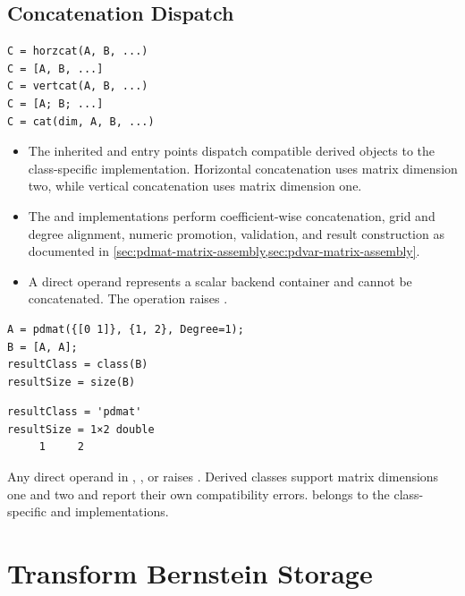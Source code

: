 \subsection{Concatenation Dispatch}
\label{sec:pdbase-concatenation-dispatch}

\syntaxhead
\begin{lstlisting}[style=dpsyntax]
C = horzcat(A, B, ...)
C = [A, B, ...]
C = vertcat(A, B, ...)
C = [A; B; ...]
C = cat(dim, A, B, ...)
\end{lstlisting}

\descriptionhead
\begin{itemize}[leftmargin=*]
    \item The inherited  and  entry points dispatch compatible derived objects to the class-specific  implementation. Horizontal concatenation uses matrix dimension two, while vertical concatenation uses matrix dimension one.
    \item The  and  implementations perform coefficient-wise concatenation, grid and degree alignment, numeric promotion, validation, and result construction as documented in \cref{sec:pdmat-matrix-assembly,sec:pdvar-matrix-assembly}.
    \item A direct  operand represents a scalar backend container and cannot be concatenated. The operation raises .
\end{itemize}

\examplehead
\begin{lstlisting}[style=dpmatlab]
A = pdmat({[0 1]}, {1, 2}, Degree=1);
B = [A, A];
resultClass = class(B)
resultSize = size(B)
\end{lstlisting}
\begin{lstlisting}[style=dpoutput]
resultClass = 'pdmat'
resultSize = 1×2 double
     1     2
\end{lstlisting}

\remarkshead
Any direct  operand in , , or  raises \allowbreak{}. Derived classes support matrix dimensions one and two and report their own compatibility errors.  belongs to the class-specific  and  implementations.

\section{Transform Bernstein Storage}

